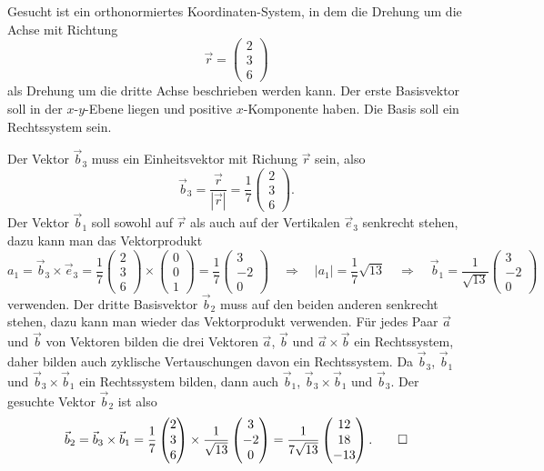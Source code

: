 Gesucht ist ein orthonormiertes Koordinaten-System, in dem die
Drehung um die Achse mit Richtung
\[
\vec{r}
=
\begin{pmatrix} 2\\3\\6 \end{pmatrix}
\]
als Drehung um die dritte Achse beschrieben werden kann.
Der erste Basisvektor soll in der $x$-$y$-Ebene liegen und positive
$x$-Komponente haben.
Die Basis soll ein Rechtssystem sein.


\begin{loesung}
Der Vektor $\vec{b}_3$ muss ein Einheitsvektor mit Richung $\vec{r}$ sein,
also
\[
\vec{b}_3
=
\frac{\vec{r}}{|\vec{r}|}
=
\frac{1}{7}
\begin{pmatrix} 2\\3\\6 \end{pmatrix}.
\]
Der Vektor $\vec{b}_1$ soll sowohl auf $\vec{r}$ als auch auf der
Vertikalen $\vec{e}_3$ senkrecht stehen, dazu kann man das Vektorprodukt
\[
a_1
=
\vec{b}_3\times \vec{e}_3
=
\frac17
\begin{pmatrix} 2\\3\\6 \end{pmatrix}
\times
\begin{pmatrix} 0\\0\\1\end{pmatrix}
=
\frac17
\begin{pmatrix} 3\\-2\\0 \end{pmatrix}
\quad\Rightarrow\quad
|a_1|=\frac17 \sqrt{13}
\quad\Rightarrow\quad
\vec{b}_1
=
\frac{1}{\sqrt{13}}
\begin{pmatrix} 3\\-2\\0 \end{pmatrix}
\]
verwenden.
Der dritte Basisvektor $\vec{b}_2$ muss auf den beiden anderen senkrecht
stehen, dazu kann man wieder das Vektorprodukt verwenden.
Für jedes Paar $\vec{a}$ und $\vec{b}$ von Vektoren bilden die drei
Vektoren $\vec{a}$, $\vec{b}$ und $\vec{a}\times\vec{b}$ ein Rechtssystem,
daher bilden auch zyklische Vertauschungen davon ein Rechtssystem.
Da $\vec{b}_3$, $\vec{b}_1$ und $\vec{b}_3\times\vec{b}_1$ ein Rechtssystem
bilden, dann auch
$\vec{b}_1$, $\vec{b}_3\times\vec{b}_1$ und $\vec{b}_3$.
Der gesuchte Vektor $\vec{b}_2$ ist also
\[
\vec{b}_2
=
\vec{b}_3\times \vec{b}_1
=
\frac{1}{7}
\begin{pmatrix} 2\\3\\6 \end{pmatrix}
\times
\frac{1}{\sqrt{13}}
\begin{pmatrix} 3\\-2\\0 \end{pmatrix}
=
\frac{1}{7\sqrt{13}}
\begin{pmatrix}
12\\18\\-13
\end{pmatrix}.
\qedhere
\]
\end{loesung}

